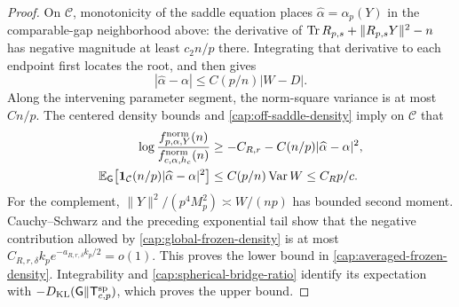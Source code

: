 \begin{proof}
On $\mathcal C$, monotonicity of the saddle equation places
$\widehat\alpha=\alpha_p(Y)$ in the comparable-gap neighborhood above:
the derivative of $\operatorname{Tr} R_{p,s}+\|R_{p,s}Y\|^2-n$ has negative
magnitude at least $c_2n/p$ there. Integrating that derivative to each
endpoint first locates the root, and then gives
\[
 |\widehat\alpha-\alpha|\le C(p/n)|W-D|.
\]
Along the intervening parameter segment, the norm-square variance is
at most $Cn/p$. The centered density bounds and
\eqref{cap:off-saddle-density} imply on $\mathcal C$ that
\begin{align*}
 \log\frac{f_{p,\alpha,Y}^{\rm norm}(n)}
              {f_{c,\alpha,h_c}^{\rm norm}(n)}
 &\ge-C_{R,r}-C(n/p)|\widehat\alpha-\alpha|^2,\\
 \mathbb E_{\mathsf G}\!\left[
  \mathbf1_{\mathcal C}(n/p)|\widehat\alpha-\alpha|^2\right]
 &\le C(p/n)\operatorname{Var} W\le C_Rp/c.
\end{align*}
For the complement, $\|Y\|^2/(p^4M_p^2)\asymp W/(np)$ has bounded
second moment. Cauchy--Schwarz and the preceding exponential tail show
that the negative contribution allowed by
\eqref{cap:global-frozen-density} is at most
$C_{R,r,\delta}k_pe^{-a_{R,r,\delta}k_p/2}=o(1)$.
This proves the lower bound in \eqref{cap:averaged-frozen-density}.
Integrability and \eqref{cap:spherical-bridge-ratio} identify its
expectation with $-D_{\rm KL}(\mathsf G\Vert\mathsf T_{c,p}^{\rm sp})$,
which proves the upper bound.


\end{proof}
